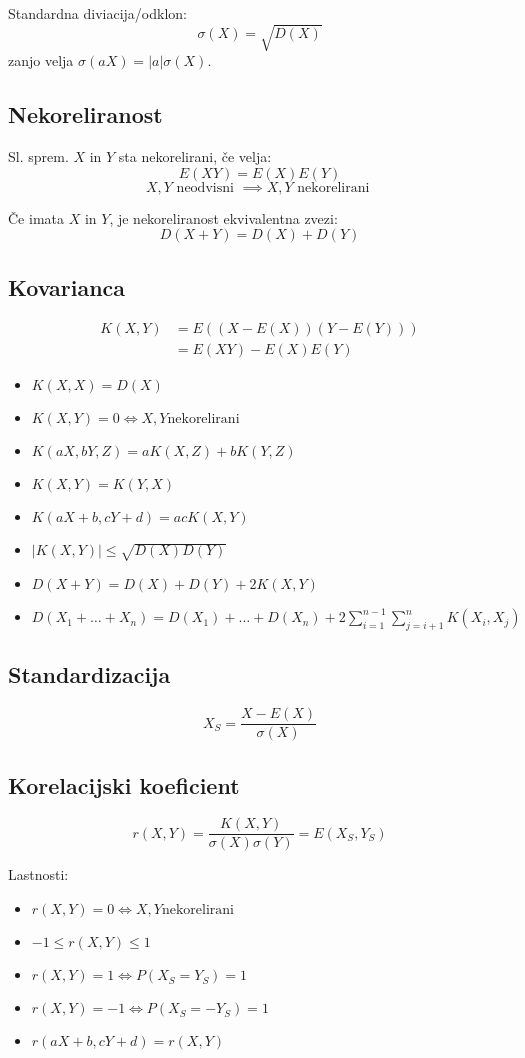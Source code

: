 \begin{multicols}{5}
Standardna diviacija/odklon:
\[ \sigma(X) = \sqrt{D(X)} \]
zanjo velja $\sigma (aX) = |a|\sigma(X)$.


\subsection{Nekoreliranost}
Sl. sprem. $X$ in $Y$ sta nekorelirani, če velja:
\[ E(XY) = E(X)E(Y) \]
\[ X, Y \text{ neodvisni } \implies X,Y \text{ nekorelirani }\]

Če imata $X$ in $Y$, je nekoreliranost ekvivalentna zvezi:
\[ D(X+Y) = D(X) + D(Y)\]

\subsection{Kovarianca}
\begin{align*}
	K(X,Y) &= E((X-E(X))(Y-E(Y))) \\
	&= E(XY)-E(X)E(Y)
\end{align*}

\begin{itemize}
	\item $K(X,X) = D(X)$
	\item $K(X,Y) = 0 \iff X,Y \text{nekorelirani}$
	\item $K(aX,bY, Z) = aK(X, Z) + bK(Y, Z)$
	\item $K(X,Y) = K(Y,X)$
	\item $K(aX+b,cY+d) = acK(X,Y)$
	\item $|K(X,Y)| \leq \sqrt{D(X)D(Y)}$
	\item $D(X+Y) = D(X) + D(Y) + 2K(X,Y)$ 
	\item $D(X_1 + \dots + X_n) = D(X_1) + \dots + D(X_n) + 2\sum_{i=1}^{n-1}\sum_{j=i+1}^{n} K(X_i, X_j)$
\end{itemize}

\subsection{Standardizacija}
\[X_S = \frac{X-E(X)}{\sigma(X)}\]

\subsection{Korelacijski koeficient}
\[r(X,Y) = \frac{K(X, Y)}{ \sigma(X) \sigma(Y)} = E(X_S, Y_S)\]

Lastnosti:
\begin{itemize}
	\item $r(X,Y) = 0 \iff X, Y \text{nekorelirani}$
	\item $-1 \leq r(X,Y) \leq 1$
	\item $r(X,Y) = 1 \iff P(X_S = Y_S) = 1$
	\item $r(X,Y) = -1 \iff P(X_S = -Y_S) = 1$
	\item $r(aX+b, cY+d) = r(X, Y)$
\end{itemize}


\end{multicols}
